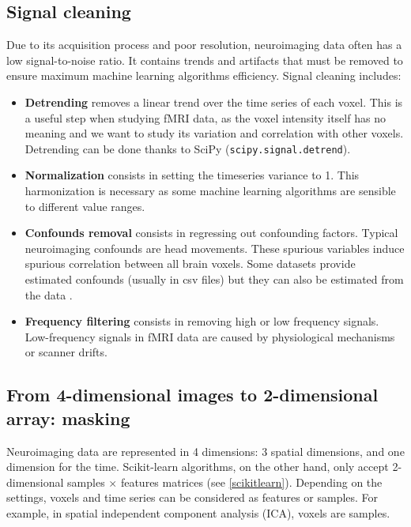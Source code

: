 \documentclass{frontiersSCNS} %
\begin{document}
\subsection{Signal cleaning}

Due to its acquisition process and poor resolution, neuroimaging data often has a low
signal-to-noise ratio. It contains trends and artifacts that must be removed
to ensure maximum machine learning algorithms efficiency. Signal cleaning
includes:
\begin{itemize}
    \item{\bf Detrending} removes a linear trend over the time series of each
        voxel. This is a useful step when studying fMRI data, as the voxel
        intensity itself has no meaning and we want to study its variation and
        correlation with other voxels. Detrending can be done thanks to SciPy
        (\texttt{scipy.signal.detrend}).
    \item{\bf Normalization} consists in setting the timeseries variance to 1.
        This harmonization is necessary as some machine learning algorithms are
        sensible to different value ranges.
    \item{\bf Confounds removal} consists in regressing out confounding factors.
        Typical neuroimaging confounds are head movements. These spurious
        variables induce spurious correlation between all brain voxels.
        Some datasets provide estimated confounds (usually in csv files) but
        they can also be estimated from the data \citep{behzadi2007}.
    \item{\bf Frequency filtering} consists in removing high or low
        frequency signals. Low-frequency signals in fMRI data are caused by
        physiological mechanisms or scanner drifts.
\end{itemize}

\subsection{From 4-dimensional images to 2-dimensional array: masking}

Neuroimaging data are represented in 4 dimensions: 3 spatial dimensions, and 
one dimension for the time.
Scikit-learn algorithms, on the other hand, only accept 2-dimensional
samples $\times$ features matrices (see \ref{scikitlearn}).
Depending on the settings, voxels and time series can be
considered as features
or samples. For example, in spatial independent component analysis (ICA),
voxels are samples.
\end{document}
